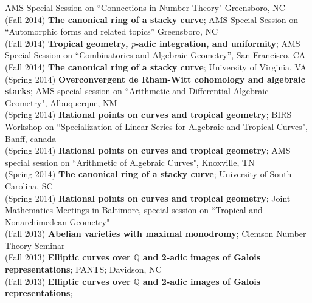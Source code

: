\documentclass[margin,line]{res}
\begin{document}
\begin{resume}
AMS Special Session on  ``Connections in Number Theory" Greensboro, NC
\vspace{.05cm}\\
(Fall 2014) \textbf{The canonical ring of a stacky curve};
AMS Special Session on ``Automorphic forms and related topics'' Greensboro, NC
\vspace{.05cm}\\
(Fall 2014) \textbf{Tropical geometry, $p$-adic integration, and uniformity};
AMS Special Session on ``Combinatorics and Algebraic Geometry'', San Francisco, CA
\vspace{.05cm}\\
(Fall 2014) \textbf{The canonical ring of a stacky curve};  
University of Virginia, VA
\vspace{.05cm}\\
(Spring 2014) \textbf{Overconvergent de Rham-Witt cohomology and algebraic stacks};  
AMS special session on ``Arithmetic and Differential Algebraic Geometry", Albuquerque, NM
\vspace{.05cm}\\
(Spring 2014) \textbf{Rational points on curves and tropical geometry};  
BIRS Workshop on ``Specialization of Linear Series for Algebraic and Tropical Curves", Banff, canada
\vspace{.05cm}\\
(Spring 2014) \textbf{Rational points on curves and tropical geometry};  
AMS special session on ``Arithmetic of Algebraic Curves", Knoxville, TN
\vspace{.05cm}\\
(Spring 2014) \textbf{The canonical ring of a stacky curve};  
University of South Carolina, SC
\vspace{.05cm}\\
(Spring 2014) \textbf{Rational points on curves and tropical geometry};  
Joint Mathematics Meetings in Baltimore, special session on ``Tropical and Nonarchimedean Geometry"  
\vspace{.05cm}\\
(Fall 2013) \textbf{Abelian varieties with maximal monodromy};  
Clemson Number Theory Seminar 
\vspace{.05cm}\\
(Fall 2013) \textbf{Elliptic curves over $\mathbb{Q}$ and 2-adic images of Galois representations};  
PANTS; Davidson, NC
\vspace{.05cm}\\
(Fall 2013) \textbf{Elliptic curves over $\mathbb{Q}$ and 2-adic images of Galois representations};  

\end{resume}
\end{document}
